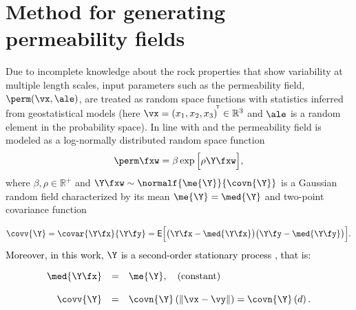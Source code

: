 \section{Method for generating permeability fields}\label{fieldgeneratio}

Due to incomplete knowledge about the rock properties that show variability at multiple length scales, input parameters such as the permeability field, $\perm(\vx,\ale)$, are treated as random space functions with statistics inferred from geostatistical models (here $\vx =\left( x_{1},x_{2},x_{3}  \right)^{\! ^{\mathsf{T}}}\in \mathbb{R}^{3}$ and $\ale$ is a random element in the probability space).
In line with \cite{dagan89} and \cite{gelhar93} the permeability field is modeled as a log-normally distributed random space function
%
\begin{equation}
  \perm\fxw = \beta\exp\Big[\rho\Y\fxw\Big],
\label{field}
\end{equation}
%
\noindent where $\beta,\rho\in\mathbb{R}^{+}$ and $\Y\fxw \sim \normalf{\me{\Y}}{\covn{\Y}}$ is a Gaussian random field
characterized by its mean $\me{\Y} = \med{\Y}$ and two-point covariance function

\begin{equation}
 \covv{\Y} = \covar{\Y\fx}{\Y\fy} = \mathsf{E}\Big[ \big( \Y\fx - \med{\Y\fx}  \big) \big( \Y\fy - \med{\Y\fy}  \big) \Big].
 \label{covg}
\end{equation}
%
\textcolor{black}{Moreover, in this work, $\Y$ is a second-order stationary process \citep{gelhar93}, that is:}

\begin{equation}
 \begin{array}{rcl}
    \med{\Y\fx} &=& \me{\Y},\quad \mbox{(constant)}\\ \\
    \covv{\Y}   &=& \covn{\Y}\left(\lVert \vx - \vy \rVert \right) = \covn{\Y}\left(d\right).
 \end{array}
\end{equation}


